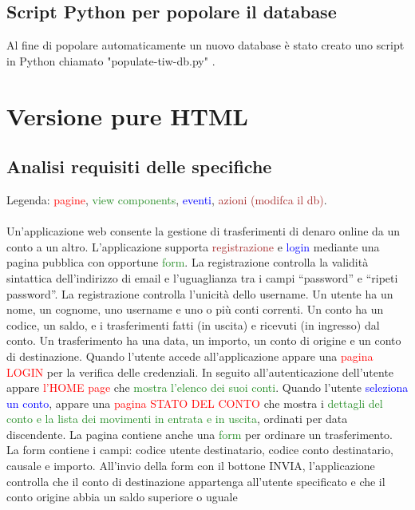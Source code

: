 \documentclass{article}
\begin{document}
\subsection{Script Python per popolare il database}
Al fine di popolare automaticamente un nuovo database è stato creato uno script in Python chiamato "populate-tiw-db.py" .

\section{Versione pure HTML}

\subsection{Analisi requisiti delle specifiche}
Legenda: \textcolor{red}{pagine}, \textcolor{ForestGreen}{view components}, \textcolor{blue}{eventi}, \textcolor{brown}{azioni (modifca il db)}.
\\
\\
Un’applicazione web consente la gestione di trasferimenti di denaro online da un conto a un
altro. L’applicazione supporta  \textcolor{brown}{registrazione} e  \textcolor{blue}{login} mediante una pagina pubblica con
opportune  \textcolor{ForestGreen}{form}. La registrazione controlla la validità sintattica dell’indirizzo di email e
l’uguaglianza tra i campi “password” e “ripeti password”. La registrazione controlla l’unicità
dello username. Un utente ha un nome, un cognome, uno username e uno o più conti correnti.
Un conto ha un codice, un saldo, e i trasferimenti fatti (in uscita) e ricevuti (in ingresso) dal
conto. Un trasferimento ha una data, un importo, un conto di origine e un conto di destinazione.
Quando l’utente accede all’applicazione appare una  \textcolor{red}{pagina LOGIN} per la verifica delle
credenziali. In seguito all’autenticazione dell’utente appare \textcolor{red}{l’HOME page} che \textcolor{ForestGreen}{mostra l’elenco
dei suoi conti}. Quando l’utente  \textcolor{blue}{seleziona un conto}, appare una \textcolor{red}{pagina STATO DEL CONTO}
che mostra i \textcolor{ForestGreen}{dettagli del conto e la lista dei movimenti in entrata e in uscita}, ordinati per data
discendente. La pagina contiene anche una \textcolor{ForestGreen}{form} per ordinare un trasferimento. La form
contiene i campi: codice utente destinatario, codice conto destinatario, causale e importo.
All’invio della form con il bottone INVIA, l’applicazione controlla che il conto di destinazione
appartenga all’utente specificato e che il conto origine abbia un saldo superiore o uguale
\end{document}
